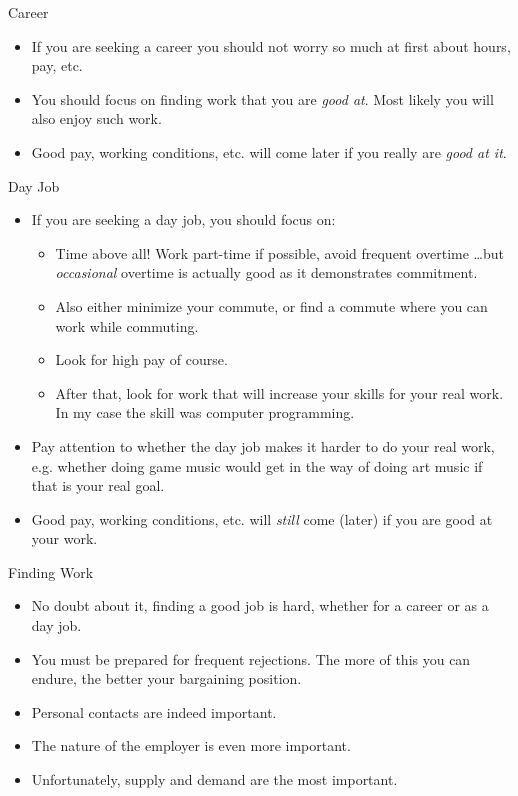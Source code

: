 \documentclass{beamer}
\begin{document}
\begin{frame}{Career}
  \begin{itemize}
  \item
    If you are seeking a career you should not worry so much at first about hours, pay, etc. 
  \item
    You should focus on finding work that you are \emph{good at}. Most likely you will also enjoy such work.
  \item
    Good pay, working conditions, etc. will come later if you really are \emph{good at it}.
  \end{itemize}
\end{frame}

\begin{frame}{Day Job}
  \begin{itemize}
  \item
    If you are seeking a day job, you should focus on:
  \begin{itemize}
    \item Time above all! Work part-time if possible, avoid frequent overtime \dots but \emph{occasional} overtime is actually good as it demonstrates commitment.
    \item Also either minimize your commute, or find a commute where you can work while commuting.
    \item Look for high pay of course.
    \item After that, look for work that will increase your skills for your real work. In my case the skill was computer programming.   
  \end{itemize}
  \item
    Pay attention to whether the day job makes it harder to do your real work, e.g. whether doing game music would get in the way of doing art music if that is your real goal.
  \item
    Good pay, working conditions, etc. will \emph{still} come (later) if you are good at your work.
  \end{itemize}
\end{frame}

\begin{frame}{Finding Work}
  \begin{itemize}
  \item
    No doubt about it, finding a good job is hard, whether for a career or as a day job.
  \item
    You must be prepared for frequent rejections. The more of this you can endure, the better your bargaining position.
  \item
    Personal contacts are indeed important.
  \item
    The nature of the employer is even more important.
  \item
    Unfortunately, supply and demand are the most important.
  \end{itemize}
\end{frame}
\end{document}

